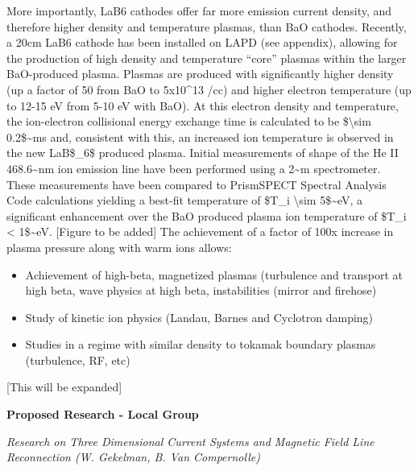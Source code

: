 \documentclass[11pt]{article}
\begin{document}
\begin{description}
More importantly, LaB6 cathodes offer far more emission current density,
and therefore higher density and temperature plasmas, than BaO cathodes.
Recently, a 20cm LaB6 cathode has been installed on LAPD (see appendix),
allowing for the production of high density and temperature ``core''
plasmas within the larger BaO-produced plasma. Plasmas are produced with
significantly higher density (up a factor of 50 from BaO to 5x10\^{}13
/cc) and higher electron temperature (up to 12-15 eV from 5-10 eV with
BaO). At this electron density and temperature, the ion-electron
collisional energy exchange time is calculated to be
\$\textbackslash{}sim 0.2\$\textasciitilde{}ms and, consistent with
this, an increased ion temperature is observed in the new LaB\$\_6\$
produced plasma. Initial measurements of shape of the He II
468.6\textasciitilde{}nm ion emission line have been performed using a
2\textasciitilde{}m spectrometer. These measurements have been compared
to PrismSPECT Spectral Analysis Code calculations yielding a best-fit
temperature of \$T\_i \textbackslash{}sim 5\$\textasciitilde{}eV, a
significant enhancement over the BaO produced plasma ion temperature of
\$T\_i \textless{} 1\$\textasciitilde{}eV. {[}Figure to be added{]} The
achievement of a factor of 100x increase in plasma pressure along with
warm ions allows:


\begin{itemize}
\item
  Achievement of high-beta, magnetized plasmas (turbulence and transport
  at high beta, wave physics at high beta, instabilities (mirror and
  firehose)
\item
  Study of kinetic ion physics (Landau, Barnes and Cyclotron damping)
\item
  Studies in a regime with similar density to tokamak boundary plasmas
  (turbulence, RF, etc)
\end{itemize}


{[}This will be expanded{]}

\textbf{Proposed Research - Local Group}


\emph{Research on Three Dimensional Current Systems and Magnetic Field
Line Reconnection (W. Gekelman, B. Van Compernolle)}


\end{description}
\end{document}
